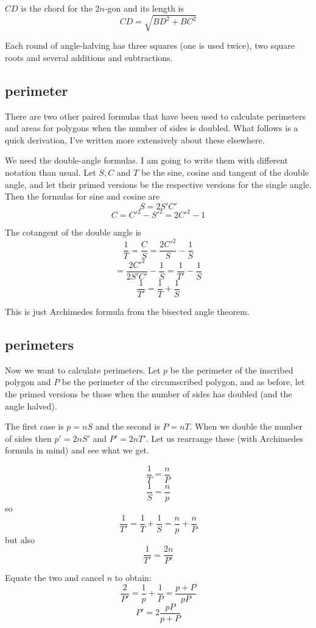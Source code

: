 \documentclass[11pt, oneside]{article}
\begin{document}
$CD$ is the chord for the $2n$-gon and its length is
\[ CD = \sqrt{BD^2 + BC^2} \]

Each round of angle-halving has three squares (one is used twice), two square roots and several additions and subtractions.

\subsection*{perimeter} 

There are two other paired formulas that have been used to calculate perimeters and areas for polygons when the number of sides is doubled.  What follows is a quick derivation, I've written more extensively about these elsewhere.

We need the double-angle formulas.  I am going to write them with different notation than usual.  Let $S,C$ and $T$ be the sine, cosine and tangent of the double angle, and let their primed versions be the respective versions for the single angle.  Then the formulas for sine and cosine are
\[ S = 2S'C' \]
\[ C = C'^2 - S'^2 = 2C'^2 - 1 \]

The cotangent of the double angle is
\[ \frac{1}{T} = \frac{C}{S} = \frac{2C'^2}{S} - \frac{1}{S} \]
\[ = \frac{2C'^2}{2S'C'} - \frac{1}{S} = \frac{1}{T'} - \frac{1}{S}  \]
\[ \frac{1}{T'} = \frac{1}{T} + \frac{1}{S} \]

This is just Archimedes formula from the bisected angle theorem.

\subsection*{perimeters}

Now we want to calculate perimeters.  Let $p$ be the perimeter of the inscribed polygon and $P$ be the perimeter of the circumscribed polygon, and as before, let the primed versions be those when the number of sides has doubled (and the angle halved).

The first case is $p = nS$ and the second is $P = nT$.  When we double the number of sides then $p' = 2nS'$ and $P' = 2nT'$.  Let us rearrange these (with Archimedes formula in mind) and see what we get.

\[ \frac{1}{T} = \frac{n}{P} \]
\[ \frac{1}{S} = \frac{n}{p} \]
so
\[ \frac{1}{T'} = \frac{1}{T} + \frac{1}{S} = \frac{n}{p} + \frac{n}{P} \]
but also
\[ \frac{1}{T'} = \frac{2n}{P'} \]

Equate the two and cancel $n$ to obtain:
\[ \frac{2}{P'} = \frac{1}{p} + \frac{1}{P} = \frac{p + P}{pP} \]
\[ P' = 2 \frac{pP}{p + P} \]
\end{document}
